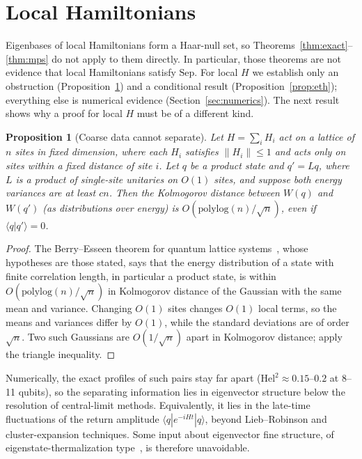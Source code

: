 \documentclass[11pt]{article}
\newtheorem{proposition}[theorem]{Proposition}
\theoremstyle{definition}
\theoremstyle{remark}
\newcommand{\ket}[1]{|#1\rangle}
\newcommand{\bra}[1]{\langle #1|}
\newcommand{\braket}[2]{\langle #1|#2\rangle}
\newcommand{\Hel}{\mathrm{Hel}}
\begin{document}
\section{Local Hamiltonians}
\label{sec:local}

Eigenbases of local Hamiltonians form a Haar-null set, so Theorems~\ref{thm:exact}--\ref{thm:mps} do not apply to them directly. In particular, those theorems are not evidence that local Hamiltonians satisfy $\mathrm{Sep}$. For local $H$ we establish only an obstruction (Proposition~\ref{prop:coarse}) and a conditional result (Proposition~\ref{prop:eth}); everything else is numerical evidence (Section~\ref{sec:numerics}). The next result shows why a proof for local $H$ must be of a different kind.

\begin{proposition}[Coarse data cannot separate]\label{prop:coarse}
Let $H=\sum_iH_i$ act on a lattice of $n$ sites in fixed dimension, where each $H_i$ satisfies $\|H_i\|\le1$ and acts only on sites within a fixed distance of site $i$. Let $q$ be a product state and $q'=Lq$, where $L$ is a product of single-site unitaries on $O(1)$ sites, and suppose both energy variances are at least $cn$. Then the Kolmogorov distance between $W(q)$ and $W(q')$ (as distributions over energy) is $O(\mathrm{polylog}(n)/\sqrt n)$, even if $\braket{q}{q'}=0$.
\end{proposition}
\begin{proof}
The Berry--Esseen theorem for quantum lattice systems~\cite{BCG2015,BrandaoCramer2015,BerryEsseen2026}, whose hypotheses are those stated, says that the energy distribution of a state with finite correlation length, in particular a product state, is within $O(\mathrm{polylog}(n)/\sqrt n)$ in Kolmogorov distance of the Gaussian with the same mean and variance. Changing $O(1)$ sites changes $O(1)$ local terms, so the means and variances differ by $O(1)$, while the standard deviations are of order $\sqrt n$. Two such Gaussians are $O(1/\sqrt n)$ apart in Kolmogorov distance; apply the triangle inequality.
\end{proof}

Numerically, the exact profiles of such pairs stay far apart ($\Hel^2\approx0.15$--$0.2$ at 8--11 qubits), so the separating information lies in eigenvector structure below the resolution of central-limit methods. Equivalently, it lies in the late-time fluctuations of the return amplitude $\bra q e^{-iHt}\ket q$, beyond Lieb--Robinson and cluster-expansion techniques. Some input about eigenvector fine structure, of eigenstate-thermalization type~\cite{Deutsch1991,Srednicki1994}, is therefore unavoidable.
\end{document}
